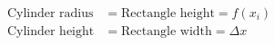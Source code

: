 \documentclass[preview]{standalone}
\begin{document}
\begin{align*}
\text{Cylinder radius}&=\text{Rectangle height}=f(x_i) \\\text{Cylinder height}&=\text{Rectangle width}=\Delta x
\end{align*}
\end{document}
